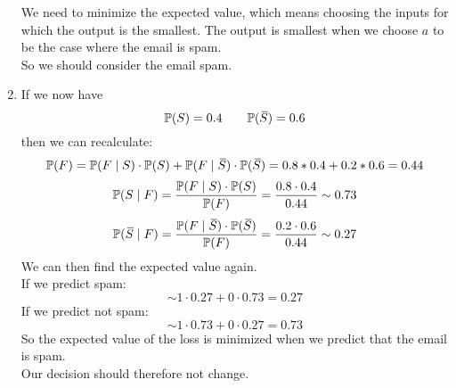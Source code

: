 \documentclass[12pt]{article}
\begin{document}
\begin{enumerate}[label=\alph*)]
    We need to minimize the expected value,
    which means
    choosing the inputs for which the output
    is the smallest.
    The output is smallest when we choose
    $a$ to be the case where the email is spam. \\
    So we should consider the email spam.
    \item 
    If we now have
    \[ \mathbb{P}(S) = 0.4 \qquad 
    \mathbb{P}(\,\overline{\!{S}}) = 0.6 \]
    then we can recalculate:
    \[\mathbb{P}(F) = \mathbb{P}(F \mid S) \cdot \mathbb{P}(S)
    +  \mathbb{P}(F \mid \,\overline{\!{S}}) \cdot \mathbb{P}(\,\overline{\!{S}})
    = 0.8 * 0.4 + 0.2 * 0.6 = 0.44 \]
    \[ \mathbb{P}(S \mid F)
    = \dfrac{\mathbb{P}(F \mid S) \cdot \mathbb{P}(S)}{\mathbb{P}(F)}
    = \dfrac{0.8 \cdot 0.4}{0.44}
    \sim 0.73 \]
    \[ \mathbb{P}(\,\overline{\!{S}} \mid F)
    = \dfrac{\mathbb{P}(F \mid \,\overline{\!{S}}) \cdot \mathbb{P}(\,\overline{\!{S}})}
    {\mathbb{P}(F)}
    = \dfrac{0.2 \cdot 0.6}{0.44}
    \sim 0.27 \]
    We can then find the expected value again. \\
    If we predict spam:
    \[ \sim 1 \cdot 0.27 + 0 \cdot 0.73 = 0.27  \]
    If we predict not spam:
    \[ \sim 1 \cdot 0.73 + 0 \cdot 0.27 = 0.73  \]
    So the expected value of the loss is minimized
    when we predict that the email is spam. \\
    Our decision should therefore not change. \\
\end{enumerate}
\end{document}
